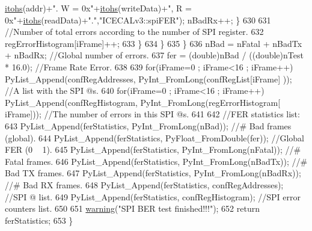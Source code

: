 \begin{DoxyCode}
      \hyperlink{classICECALv3_a04b02e583f191bfce34d05132cd23834}{itohs}(addr)+\textcolor{stringliteral}{".  W = 0x"}+\hyperlink{classICECALv3_a04b02e583f191bfce34d05132cd23834}{itohs}(writeData)+\textcolor{stringliteral}{", R = 0x"}+\hyperlink{classICECALv3_a04b02e583f191bfce34d05132cd23834}{itohs}(readData)+\textcolor{stringliteral}{"."},\textcolor{stringliteral}{"ICECALv3::spiFER"});     
      nBadRx++;    \}
630 
631                 \textcolor{comment}{//Number of total errors according to the number of SPI register.}
632                 regErrorHistogram[iFrame]++;
633             \}
634         \}
635     \}
636     nBad = nFatal + nBadTx + nBadRx;                            \textcolor{comment}{//Global number of errors.}
637     fer = (double)nBad / ((\textcolor{keywordtype}{double})nTest * 16.0);    \textcolor{comment}{//Frame Rate Error.}
638 
639     \textcolor{keywordflow}{for}(iFrame=0 ; iFrame<16 ; iFrame++) PyList\_Append(confRegAddresses, PyInt\_FromLong(confRegList[iFrame]
      ));              \textcolor{comment}{//A list with the SPI @s.}
640     \textcolor{keywordflow}{for}(iFrame=0 ; iFrame<16 ; iFrame++) PyList\_Append(confRegHistogram, PyInt\_FromLong(regErrorHistogram[
      iFrame]));    \textcolor{comment}{//The number of errors in this SPI @s.}
641 
642     \textcolor{comment}{//FER statistics list:}
643     PyList\_Append(ferStatistics, PyInt\_FromLong(nBad));         \textcolor{comment}{//# Bad frames (global).}
644     PyList\_Append(ferStatistics, PyFloat\_FromDouble(fer));  \textcolor{comment}{//Global FER (0 ~ 1).}
645     PyList\_Append(ferStatistics, PyInt\_FromLong(nFatal));       \textcolor{comment}{//# Fatal frames.}
646     PyList\_Append(ferStatistics, PyInt\_FromLong(nBadTx));       \textcolor{comment}{//# Bad TX frames.}
647     PyList\_Append(ferStatistics, PyInt\_FromLong(nBadRx));       \textcolor{comment}{//# Bad RX frames.}
648     PyList\_Append(ferStatistics, confRegAddresses);                 \textcolor{comment}{//SPI @ list.}
649     PyList\_Append(ferStatistics, confRegHistogram);                 \textcolor{comment}{//SPI error counters list.}
650 
651     \hyperlink{classObject_a65cd4fda577711660821fd2cd5a3b4c9}{warning}(\textcolor{stringliteral}{"SPI BER test finished!!!"});
652     \textcolor{keywordflow}{return} ferStatistics;
653 \}
\end{DoxyCode}
\mbox{\label{classICECALv3_aced41ce20a0853d6248b8df88412e57a}} 
